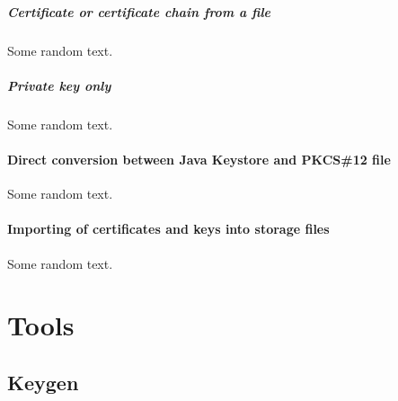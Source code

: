 \documentclass[10pt, a4paper]{report}
\begin{document}
\subsubsection{Certificate or certificate chain from a file}
Some random text.

\subsubsection{Private key only}
Some random text.

\subsection{Direct conversion between Java Keystore and PKCS\#12 file}
Some random text.

\subsection{Importing of certificates and keys into storage files}
Some random text.


\newpage

\part{Tools}



\chapter{Keygen}
\end{document}
